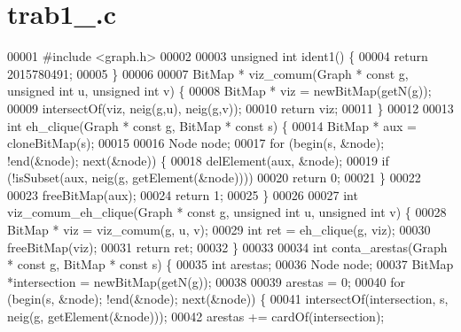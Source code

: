 \section{trab1\+\_.\+c}
\label{trab1__2015780491_8c_source}

\begin{DoxyCode}
00001 \textcolor{preprocessor}{#include <graph.h>}
00002 
00003 \textcolor{keywordtype}{unsigned} \textcolor{keywordtype}{int} ident1() \{
00004         \textcolor{keywordflow}{return} 2015780491;
00005 \}
00006 
00007 BitMap * viz_comum(Graph * \textcolor{keyword}{const} g, \textcolor{keywordtype}{unsigned} \textcolor{keywordtype}{int} u, \textcolor{keywordtype}{unsigned} \textcolor{keywordtype}{int} v) \{
00008         BitMap * viz = newBitMap(getN(g));
00009         intersectOf(viz, neig(g,u), neig(g,v));
00010         \textcolor{keywordflow}{return} viz;
00011 \}
00012 
00013 \textcolor{keywordtype}{int} eh_clique(Graph * \textcolor{keyword}{const} g, BitMap * \textcolor{keyword}{const} s) \{
00014         BitMap * aux = cloneBitMap(s);
00015 
00016         Node node;
00017         \textcolor{keywordflow}{for} (begin(s, &node); !end(&node); next(&node)) \{
00018                 delElement(aux, &node);
00019                 \textcolor{keywordflow}{if} (!isSubset(aux, neig(g, getElement(&node))))
00020                         \textcolor{keywordflow}{return} 0;
00021         \}
00022 
00023         freeBitMap(aux);
00024         \textcolor{keywordflow}{return} 1;
00025 \}
00026 
00027 \textcolor{keywordtype}{int} viz_comum_eh_clique(Graph * \textcolor{keyword}{const} g, \textcolor{keywordtype}{unsigned} \textcolor{keywordtype}{int} u, \textcolor{keywordtype}{unsigned} \textcolor{keywordtype}{int} v) \{
00028         BitMap * viz = viz_comum(g, u, v);
00029         \textcolor{keywordtype}{int} ret = eh_clique(g, viz);
00030         freeBitMap(viz);
00031         \textcolor{keywordflow}{return} ret;
00032 \}
00033 
00034 \textcolor{keywordtype}{int} conta_arestas(Graph * \textcolor{keyword}{const} g, BitMap * \textcolor{keyword}{const} s) \{
00035         \textcolor{keywordtype}{int} arestas;
00036         Node node;
00037         BitMap *intersection = newBitMap(getN(g));
00038         
00039         arestas = 0;
00040         \textcolor{keywordflow}{for} (begin(s, &node); !end(&node); next(&node)) \{
00041                 intersectOf(intersection, s, neig(g, getElement(&node)));
00042                 arestas += cardOf(intersection);

\end{DoxyCode}
